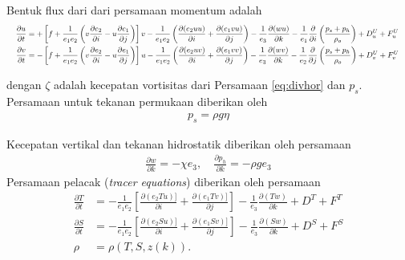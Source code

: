 \begin{spacing}{1.5}
	Bentuk flux dari dari persamaan momentum adalah
		\begin{equation*}
		\resizebox{\textwidth}{!}{%
			$
			\begin{aligned}
				\frac{\partial u}{\partial t} &= +\left[f+\frac{1}{e_1e_2}\left(v\frac{\partial e_2}{\partial i} - u\frac{\partial e_1}{\partial j}\right) \right]v -  
				\frac{1}{e_1e_2}\left(\frac{\partial (e_2uu)}{\partial i} + \frac{\partial (e_1vu)}{\partial j}\right) -
				\frac{1}{e_3}\frac{\partial (wu)}{\partial k} - \frac{1}{e_1}\frac{\partial}{\partial i}\left(\frac{p_s+p_h}{\rho_o}\right)+D^U_u+F^U_u  \\
				\frac{\partial v}{\partial t} &= -\left[f+\frac{1}{e_1e_2}\left(v\frac{\partial e_2}{\partial i} - u\frac{\partial e_1}{\partial j}\right) \right]u -  
				\frac{1}{e_1e_2}\left(\frac{\partial (e_2uv)}{\partial i} + \frac{\partial (e_1vv)}{\partial j}\right) -
				\frac{1}{e_3}\frac{\partial (wv)}{\partial k} - \frac{1}{e_2}\frac{\partial}{\partial j}\left(\frac{p_s+p_h}{\rho_o}\right)+D^U_v+F^U_v%
			\end{aligned}
			$
		}
	\end{equation*}
	
	dengan $\zeta$ adalah kecepatan vortisitas dari Persamaan \ref{eq:divhor} dan $p_s$. Persamaan untuk tekanan permukaan diberikan oleh
	\begin{equation*}
		\begin{aligned}
			p_s=\rho g \eta
		\end{aligned}
	\end{equation*}
	
	Kecepatan vertikal dan tekanan hidrostatik diberikan oleh persamaan
	\begin{equation*}
		\begin{aligned}
			\frac{\partial w}{\partial k}=-\chi e_3, \quad \frac{\partial p_h}{\partial k}=-\rho ge_3
		\end{aligned}
	\end{equation*}
	Persamaan pelacak (\textit{tracer equations}) diberikan oleh persamaan
	\begin{equation*}
		\begin{aligned}
			\frac{\partial T}{\partial t} &=-\frac{1}{e_1e_2}\left[\frac{\partial (e_2Tu)]}{\partial i}+\frac{\partial (e_1Tv)]}{\partial j}\right]-\frac{1}{e_3}\frac{\partial (Tw)}{\partial k}+D^T+F^T \\
			\frac{\partial S}{\partial t} &=-\frac{1}{e_1e_2}\left[\frac{\partial (e_2Su)]}{\partial i}+\frac{\partial (e_1Sv)]}{\partial j}\right]-\frac{1}{e_3}\frac{\partial (Sw)}{\partial k}+D^S+F^S \\			
			\rho &= \rho(T,S,z(k)).
		\end{aligned}
	\end{equation*}

\end{spacing}
